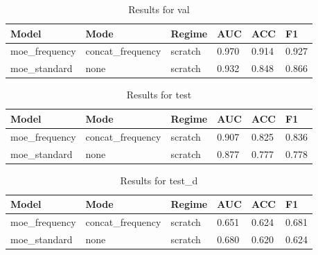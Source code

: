 \begin{table}
\caption{Results for val}
\label{tab:results_val}
\begin{tabular}{llllll}
\toprule
Model & Mode & Regime & AUC & ACC & F1 \\
\midrule
moe_frequency & concat_frequency & scratch & 0.970 & 0.914 & 0.927 \\
moe_standard & none & scratch & 0.932 & 0.848 & 0.866 \\
\bottomrule
\end{tabular}
\end{table}


\begin{table}
\caption{Results for test}
\label{tab:results_test}
\begin{tabular}{llllll}
\toprule
Model & Mode & Regime & AUC & ACC & F1 \\
\midrule
moe_frequency & concat_frequency & scratch & 0.907 & 0.825 & 0.836 \\
moe_standard & none & scratch & 0.877 & 0.777 & 0.778 \\
\bottomrule
\end{tabular}
\end{table}


\begin{table}
\caption{Results for test_d}
\label{tab:results_test_d}
\begin{tabular}{llllll}
\toprule
Model & Mode & Regime & AUC & ACC & F1 \\
\midrule
moe_frequency & concat_frequency & scratch & 0.651 & 0.624 & 0.681 \\
moe_standard & none & scratch & 0.680 & 0.620 & 0.624 \\
\bottomrule
\end{tabular}
\end{table}

